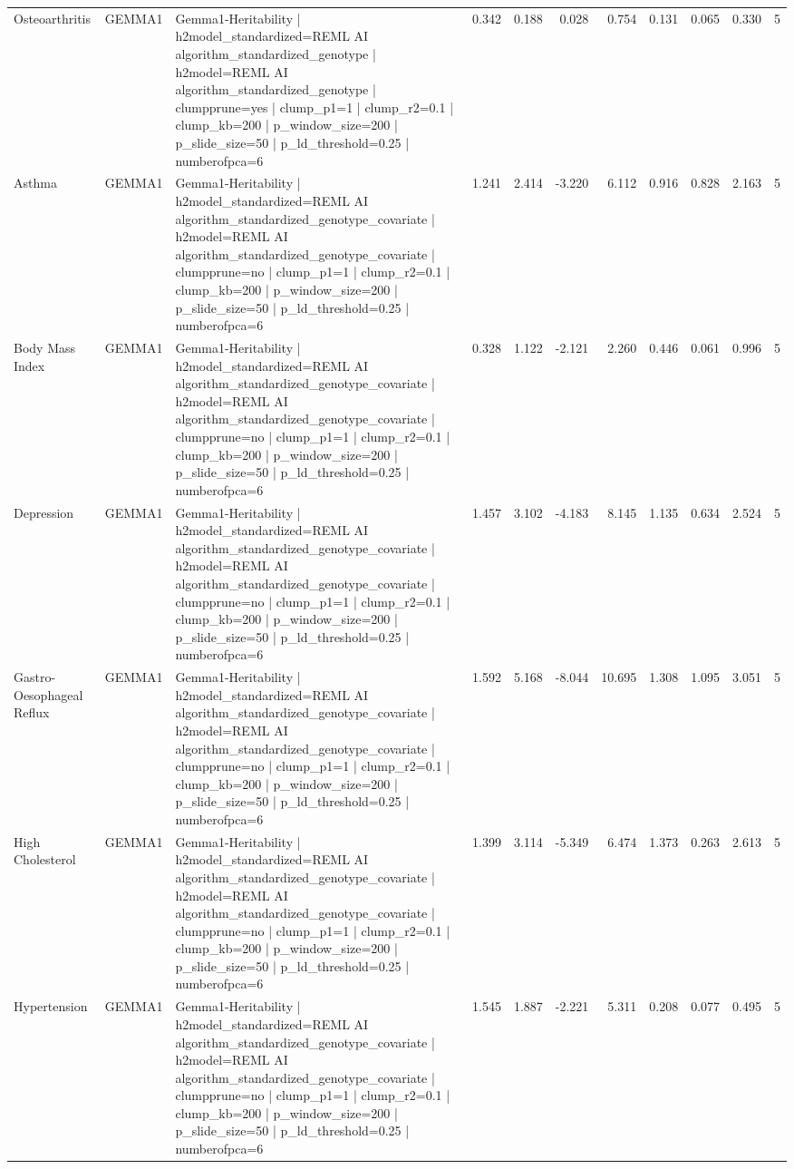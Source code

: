 \begin{landscape}
\begin{longtable}{p{2.4cm}p{1.8cm}p{6.0cm}rrrrrrrr}
Osteoarthritis & GEMMA1 & Gemma1-Heritability | h2model\_standardized=REML AI algorithm\_standardized\_genotype | h2model=REML AI algorithm\_standardized\_genotype | clumpprune=yes | clump\_p1=1 | clump\_r2=0.1 | clump\_kb=200 | p\_window\_size=200 | p\_slide\_size=50 | p\_ld\_threshold=0.25 | numberofpca=6 & 0.342 & 0.188 & 0.028 & 0.754 & 0.131 & 0.065 & 0.330 & 5 \\
Asthma & GEMMA1 & Gemma1-Heritability | h2model\_standardized=REML AI algorithm\_standardized\_genotype\_covariate | h2model=REML AI algorithm\_standardized\_genotype\_covariate | clumpprune=no | clump\_p1=1 | clump\_r2=0.1 | clump\_kb=200 | p\_window\_size=200 | p\_slide\_size=50 | p\_ld\_threshold=0.25 | numberofpca=6 & 1.241 & 2.414 & -3.220 & 6.112 & 0.916 & 0.828 & 2.163 & 5 \\
Body Mass Index & GEMMA1 & Gemma1-Heritability | h2model\_standardized=REML AI algorithm\_standardized\_genotype\_covariate | h2model=REML AI algorithm\_standardized\_genotype\_covariate | clumpprune=no | clump\_p1=1 | clump\_r2=0.1 | clump\_kb=200 | p\_window\_size=200 | p\_slide\_size=50 | p\_ld\_threshold=0.25 | numberofpca=6 & 0.328 & 1.122 & -2.121 & 2.260 & 0.446 & 0.061 & 0.996 & 5 \\
Depression & GEMMA1 & Gemma1-Heritability | h2model\_standardized=REML AI algorithm\_standardized\_genotype\_covariate | h2model=REML AI algorithm\_standardized\_genotype\_covariate | clumpprune=no | clump\_p1=1 | clump\_r2=0.1 | clump\_kb=200 | p\_window\_size=200 | p\_slide\_size=50 | p\_ld\_threshold=0.25 | numberofpca=6 & 1.457 & 3.102 & -4.183 & 8.145 & 1.135 & 0.634 & 2.524 & 5 \\
Gastro-Oesophageal Reflux & GEMMA1 & Gemma1-Heritability | h2model\_standardized=REML AI algorithm\_standardized\_genotype\_covariate | h2model=REML AI algorithm\_standardized\_genotype\_covariate | clumpprune=no | clump\_p1=1 | clump\_r2=0.1 | clump\_kb=200 | p\_window\_size=200 | p\_slide\_size=50 | p\_ld\_threshold=0.25 | numberofpca=6 & 1.592 & 5.168 & -8.044 & 10.695 & 1.308 & 1.095 & 3.051 & 5 \\
High Cholesterol & GEMMA1 & Gemma1-Heritability | h2model\_standardized=REML AI algorithm\_standardized\_genotype\_covariate | h2model=REML AI algorithm\_standardized\_genotype\_covariate | clumpprune=no | clump\_p1=1 | clump\_r2=0.1 | clump\_kb=200 | p\_window\_size=200 | p\_slide\_size=50 | p\_ld\_threshold=0.25 | numberofpca=6 & 1.399 & 3.114 & -5.349 & 6.474 & 1.373 & 0.263 & 2.613 & 5 \\
Hypertension & GEMMA1 & Gemma1-Heritability | h2model\_standardized=REML AI algorithm\_standardized\_genotype\_covariate | h2model=REML AI algorithm\_standardized\_genotype\_covariate | clumpprune=no | clump\_p1=1 | clump\_r2=0.1 | clump\_kb=200 | p\_window\_size=200 | p\_slide\_size=50 | p\_ld\_threshold=0.25 | numberofpca=6 & 1.545 & 1.887 & -2.221 & 5.311 & 0.208 & 0.077 & 0.495 & 5 \\

\end{longtable}
\end{landscape}
